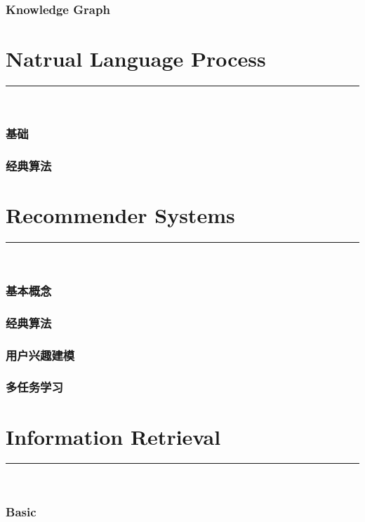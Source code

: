 \documentclass{article}
\begin{document}
\section{Knowledge Graph}



\clearpage
\part{Natrual Language Process}
{\noindent}	 \rule[-10pt]{17.5cm}{0.5em}\\
\section{基础}


\section{经典算法}



\clearpage
\part{Recommender Systems}
{\noindent}	 \rule[-10pt]{17.5cm}{0.5em}\\
\section{基本概念}


\section{经典算法}


\section{用户兴趣建模}


\section{多任务学习}



\clearpage
\part{Information Retrieval}
{\noindent}	 \rule[-10pt]{17.5cm}{0.5em}\\
\section{Basic}

\end{document}
